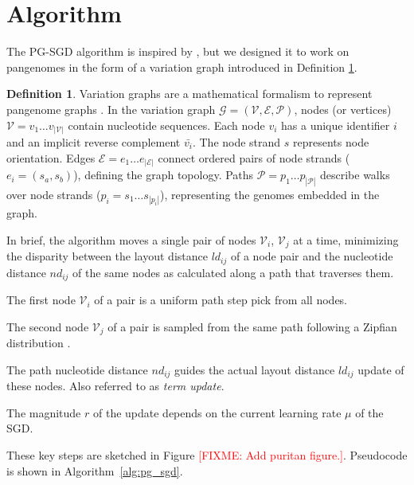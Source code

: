 \documentclass{bioinfo}
\theoremstyle{definition}
\newtheorem{definition}{Definition}[section]
\newcommand{\red}[1]{{\textcolor{Red}{#1}}}
\newcommand{\FIXME}[1]{\red{[FIXME: #1]}}
\begin{document}
	\section{Algorithm}
	
	The PG-SGD algorithm is inspired by \cite{Zheng2019}, but we designed it to work on pangenomes in the form of a variation graph introduced in Definition \ref{def:vg}.

	\begin{definition}
		\label{def:vg}
		Variation graphs are a mathematical formalism to represent pangenome graphs \citep{Garrison_2019_thesis}.
		In the variation graph $\mathcal{G} = (\mathcal{V}, \mathcal{E}, \mathcal{P})$, nodes (or vertices) $\mathcal{V} = v_1\ldots v_{|\mathcal{V}|}$ contain nucleotide sequences.
		Each node $v_i$ has a unique identifier $i$ and an implicit reverse complement $\bar{v_i}$.
		The node strand $s$ represents node orientation.
		Edges $\mathcal{E} = e_1\ldots e_{|\mathcal{E}|}$ connect ordered pairs of node strands ($e_i = ( s_a, s_b )$), defining the graph topology.
		Paths $\mathcal{P} = p_1\ldots p_{|\mathcal{P}|}$ describe walks over node strands ($p_i = s_1 \ldots s_{|p_i|}$), representing the genomes embedded in the graph.
	\end{definition}

	In brief, the algorithm moves a single pair of nodes $\mathcal{V}_i$, $\mathcal{V}_j$ at a time, minimizing the disparity between the layout distance $ld_{ij}$ of a node pair and the nucleotide distance $nd_{ij}$ of the same nodes as calculated along a path that traverses them.
	\begin{enumerate*}[label=(\roman*)]
		\item The first node $\mathcal{V}_i$ of a pair is a uniform path step pick from all nodes.
		\item The second node $\mathcal{V}_j$ of a pair is sampled from the same path following a Zipfian distribution \citep{Zipf1932}.
		\item The path nucleotide distance  $nd_{ij}$ guides the actual layout distance $ld_{ij}$ update of these nodes. Also referred to as \textit{term update}.
		\item The magnitude $r$ of the update depends on the current learning rate $\mu$ of the SGD.
	\end{enumerate*}
	These key steps are sketched in Figure \FIXME{Add puritan figure.}. Pseudocode is shown in Algorithm~\ref{alg:pg_sgd}.
	
\end{document}
